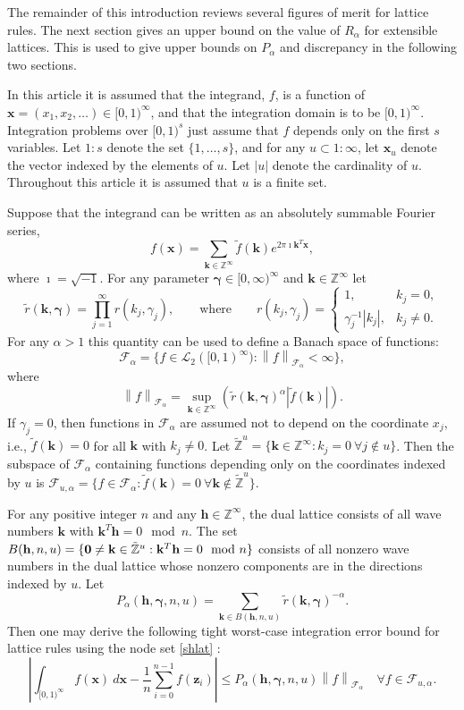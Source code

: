 \documentclass{article}
\renewcommand{\vec}[1]{\ensuremath{\mathbf{#1}}}
\newcommand{\vecsym}[1]{\ensuremath{\boldsymbol{#1}}}
\def\abs#1{\ensuremath{\left \lvert #1 \right \rvert}}
\def\norm#1{\ensuremath{\left \lVert #1 \right \rVert}}
\newcommand{\bfgam}{\vecsym \gamma}
\newcommand{\Ltwo}{{\mathcal L}_{2}}
\newcommand{\calF}{\mathcal F}
\newcommand{\zero}{{\bf 0}}
\newcommand{\Cinf}{[0,1)^{\infty}}
\newcommand{\Cs}{[0,1)^{s}}
\renewcommand{\k}{\vec k}
\newcommand{\h}{\vec h}
\newcommand{\x}{\vec x}
\newcommand{\z}{\vec z}
\newcommand{\Z}{\mathbb{Z}}
\newcommand{\tZu}{\tilde{\Z}^{u}}
\begin{document}
The remainder of this introduction reviews several figures of merit
for lattice rules.  The next section gives an upper bound on the value
of $R_{\alpha}$ for extensible lattices.  This is used to give upper
bounds on $P_{\alpha}$ and discrepancy in the following two sections.

In this article it is assumed that the integrand, $f$, is a function
of $\x=(x_{1}, x_{2}, \ldots) \in \Cinf$, and that the integration
domain is to be $\Cinf$.  Integration problems over $\Cs$ just assume
that $f$ depends only on the first $s$ variables.  Let $1:s$ denote
the set $\{1, \ldots, s\}$, and for any $u \subset 1:\infty$, let
$\x_{u}$ denote the vector indexed by the elements of $u$.  Let
$\abs{u}$ denote the cardinality of $u$.  Throughout this article it
is assumed that $u$ is a finite set.

Suppose that the integrand can be written as an absolutely summable
Fourier series,
$$
f(\x) = \sum_{\k \in \Z^{\infty}} \tilde{f}(\k) e^{2 \pi \imath 
\k^{T} \x},
$$
where $\imath=\sqrt{-1}$.  For any parameter $\bfgam \in
[0,\infty)^{\infty}$ and $\k \in \Z^{\infty}$ let
$$
\tilde{r}(\k,\bfgam) = \prod_{j=1}^{\infty} r(k_{j},\gamma_{j}),
\qquad \text{where} \qquad r(k_{j},\gamma_{j})=\begin{cases} 1, &
k_{j}=0, \\ \gamma_{j}^{-1} \abs{k_{j}}, & k_{j} \ne 0.  \end{cases}
$$ 
For any $\alpha > 1$ this quantity can be used to define a Banach
space of functions:
$$
\calF_{\alpha} = \{ f \in \Ltwo(\Cinf) : 
\norm{f}_{\calF_{\alpha}} < \infty \},
$$
where
$$
\norm{f}_{\calF_{\alpha}} = \sup_{\k \in \Z^{\infty}}
\left(\tilde{r}(\k,\bfgam)^{\alpha} \abs{\tilde{f}(\k)} \right).
$$
If $\gamma_{j}=0$, then functions in $\calF_{\alpha}$ are assumed not
to depend on the coordinate $x_{j}$, i.e., $\tilde{f}(\k)=0$ for all
$\k$ with $k_{j} \ne 0$.  Let $\tZu = \{ \k \in \Z^{\infty} : k_{j}=0
\ \forall j \notin u \}$.  Then the subspace of $\calF_{\alpha}$
containing functions depending only on the coordinates indexed by $u$ is
$\calF_{u,\alpha} = \{ f \in \calF_{\alpha} : \tilde{f}(\k)=0 \
\forall \k \notin \tZu \}$.

For any positive integer $n$ and any $\h \in \Z^{\infty}$, the dual
lattice consists of all wave numbers $\k$ with $\k^{T}\h = 0 \mod n$.  The set $B(\h,n,u) = \{ \zero \ne \k \in \tZu : \k^{T}\h = 0 \mod n\}$ consists
of all nonzero wave numbers in the dual lattice whose nonzero
components are in the directions indexed by $u$.  Let
\begin{equation} \label{Pdef}
P_{\alpha}(\h,\bfgam,n,u) = \sum_{\k \in B(\h,n,u)} 
\tilde{r}(\k,\bfgam)^{-\alpha}.
\end{equation}
Then one may derive the following tight worst-case integration error bound 
for lattice rules using the node set \eqref{shlat} \cite{Hic98b}:
\begin{equation} \label{quaderr1}
    \abs{\int_{\Cinf} f(\x) \ d\x - \frac 1n \sum_{i=0}^{n-1} f(\z_{i})}
    \le P_{\alpha}(\h,\bfgam,n,u) \norm{f}_{\calF_{\alpha}} \quad
    \forall f \in \calF_{u,\alpha}.
\end{equation}
\end{document}
